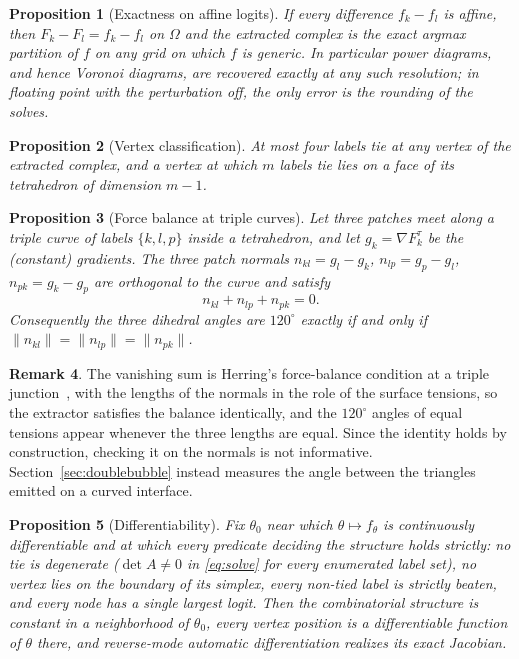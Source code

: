 \documentclass{egpubl}
\newtheorem{proposition}{Proposition}
\theoremstyle{definition}
\newtheorem{remark}[proposition]{Remark}
\newcommand{\tet}{\tau}
\newcommand{\interp}{F}
\begin{document}
\begin{proposition}[Exactness on affine logits]
\label{prop:affine}
If every difference $f_k - f_l$ is affine, then
$\interp_k - \interp_l = f_k - f_l$ on $\Omega$ and the extracted complex is
the exact argmax partition of $f$ on any grid on which $f$ is generic. In
particular power diagrams, and hence Voronoi diagrams, are recovered exactly
at any such resolution; in
floating point with the perturbation off, the only error is the rounding of
the solves.
\end{proposition}

\begin{proposition}[Vertex classification]
\label{prop:classify}
At most four labels tie at any vertex of the extracted complex, and a vertex at
which $m$ labels tie lies on a face of its tetrahedron of dimension $m-1$.
\end{proposition}

\begin{proposition}[Force balance at triple curves]
\label{prop:plateau}
Let three patches meet along a triple curve of labels $\{k,l,p\}$ inside a
tetrahedron, and let $g_k = \nabla \interp^\tet_k$ be the (constant) gradients.
The three patch normals $n_{kl} = g_l - g_k$, $n_{lp} = g_p - g_l$,
$n_{pk} = g_k - g_p$ are orthogonal to the curve and satisfy
\[
  n_{kl} + n_{lp} + n_{pk} = 0 .
\]
Consequently the three dihedral angles are $120^\circ$ exactly if and only if
$\|n_{kl}\| = \|n_{lp}\| = \|n_{pk}\|$.
\end{proposition}

\begin{remark}
The vanishing sum is Herring's force-balance condition at a triple
junction~\cite{herring1951, taylor1976}, with the lengths of the normals in
the role of the surface tensions, so the extractor satisfies the balance
identically, and the $120^\circ$ angles of equal tensions appear whenever
the three lengths are equal. Since the identity holds by construction,
checking it on the normals is not informative. Section~\ref{sec:doublebubble}
instead measures the angle between the triangles emitted on a curved
interface.
\end{remark}

\begin{proposition}[Differentiability]
\label{prop:diff}
Fix $\theta_0$ near which $\theta \mapsto f_\theta$ is continuously
differentiable and at which every predicate deciding the structure holds
strictly: no tie is degenerate
($\det A \neq 0$ in \eqref{eq:solve} for every enumerated label set), no vertex lies
on the boundary of its simplex, every non-tied label is strictly beaten, and
every node has a single largest logit. Then the combinatorial
structure is constant in a neighborhood of $\theta_0$, every vertex position
is a differentiable function of $\theta$ there, and reverse-mode automatic
differentiation realizes its exact Jacobian.
\end{proposition}
\end{document}
